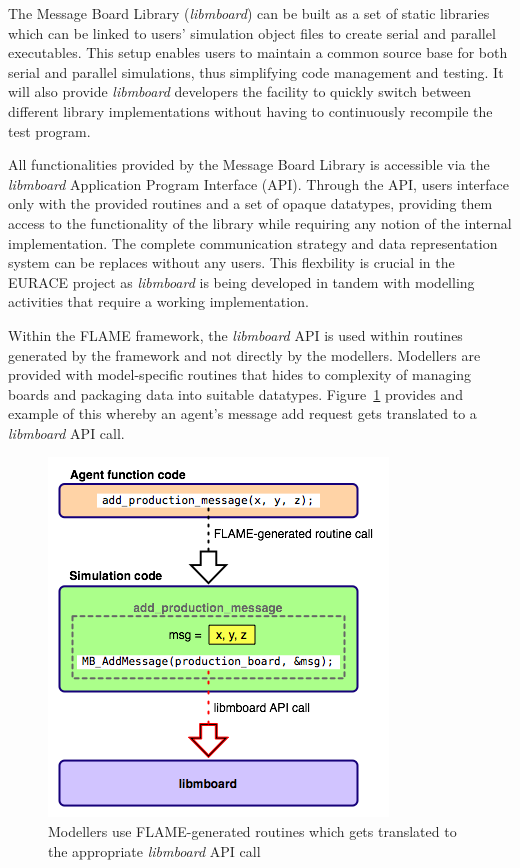 The Message Board Library (\textit{libmboard}) can be built as a set of static libraries which can be linked to users' simulation object files to create serial and parallel executables. This setup enables users to maintain a common source base for both serial and parallel simulations, thus simplifying code management and testing. It will also provide \textit{libmboard} developers the facility to quickly switch between different library implementations without having to continuously recompile the test program.

All functionalities provided by the Message Board Library is accessible via the \textit{libmboard} Application Program Interface (API). Through the API, users interface only with the provided routines and a set of opaque datatypes, providing them access to the functionality of the library while requiring any notion of the internal implementation. The complete communication strategy and data representation system can be replaces without any users. This flexbility is crucial in the EURACE project as \textit{libmboard} is being developed in tandem with modelling activities that require a working implementation.


Within the FLAME framework, the \textit{libmboard} API is used within routines generated by the framework and not directly by the modellers. Modellers are provided with model-specific routines that hides to complexity of managing boards and packaging data into suitable datatypes. Figure~\ref{fig:mb_api_flame} provides and example of this whereby an agent's message add request gets translated to a \textit{libmboard} API call.
\begin{figure}[h]
 \centering
  \includegraphics[scale=0.60]{mboard_codetranslate.png}
 \caption{Modellers use FLAME-generated routines which gets translated to the appropriate \textit{libmboard} API call}
 \label{fig:mb_api_flame}
\end{figure}

